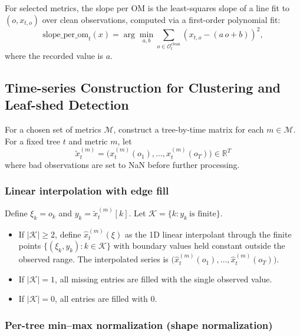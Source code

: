 \documentclass{article}
\begin{document}
For selected metrics, the slope per OM is the least-squares slope of a line fit to $(o, x_{t,o})$ over clean observations,
computed via a first-order polynomial fit:
\begin{equation}
\mathrm{slope\_per\_om}_t(x) = \arg\min_{a,b}\sum_{o\in\mathcal{O}^{\mathrm{clean}}_t} (x_{t,o} - (a\,o + b))^2,
\end{equation}
where the recorded value is $a$.

\subsection{Time-series Construction for Clustering and Leaf-shed Detection}

For a chosen set of metrics $\mathcal{M}$, construct a tree-by-time matrix for each $m\in\mathcal{M}$.
For a fixed tree $t$ and metric $m$, let
\begin{equation}
\tilde{x}^{(m)}_{t} = \bigl( x^{(m)}_{t}(o_{1}),\dots,x^{(m)}_{t}(o_{T})\bigr)\in\mathbb{R}^T
\end{equation}
where bad observations are set to NaN before further processing.

\subsubsection{Linear interpolation with edge fill}

Define $\xi_k=o_k$ and $y_k=\tilde{x}^{(m)}_{t}[k]$.
Let $\mathcal{K}=\{k: y_k\ \text{is finite}\}$.

\begin{itemize}[leftmargin=*, itemsep=2pt]
\item If $|\mathcal{K}|\ge 2$, define $\hat{x}^{(m)}_{t}(\xi)$ as the 1D linear interpolant through the finite points
$\{(\xi_k, y_k): k\in\mathcal{K}\}$ with boundary values held constant outside the observed range.
The interpolated series is
$\bigl(\hat{x}^{(m)}_{t}(o_{1}),\dots,\hat{x}^{(m)}_{t}(o_{T})\bigr)$.
\item If $|\mathcal{K}|=1$, all missing entries are filled with the single observed value.
\item If $|\mathcal{K}|=0$, all entries are filled with $0$.
\end{itemize}

\subsubsection{Per-tree min--max normalization (shape normalization)}
\end{document}
